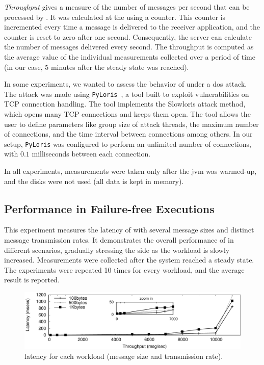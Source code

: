 \emph{Throughput} gives a measure of the number of messages per second that can be processed by \sieveq. 
It was calculated at the \postsieve using a counter. 
This counter is incremented every time a message is delivered to the receiver application, and the counter is reset to zero after one second. 
Consequently, the server can calculate the number of messages delivered every second. 
The throughput is computed as the average value of the individual measurements collected over a period of time (in our case, 5 minutes after the steady state was reached).

In some experiments, we wanted to assess the behavior of \sieveq under a \gls{dos} attack. 
The attack was made using \texttt{PyLoris}~\cite{pyloris}, a tool built to exploit vulnerabilities on TCP connection handling.
The tool implements the Slowloris attack method, which opens many TCP connections and keeps them open.
The tool allows the user to define parameters like group size of attack threads, the maximum number of connections, and the time interval between connections among others.
In our setup, \texttt{PyLoris} was configured to perform an unlimited number of connections, with $0.1$ milliseconds between each connection.

In all experiments, measurements were taken only after the \gls{jvm} was warmed-up, and the disks were not used (all data is kept in memory).


\subsection{Performance in Failure-free Executions}
\label{throughput_latency}

This experiment measures the latency of \sieveq with several message sizes and distinct message transmission rates. 
It demonstrates the overall performance of \sieveq in different scenarios, gradually stressing the \postsieve side as the workload is slowly increased. 
Measurements were collected after the system reached a steady state. 
The experiments were repeated 10 times for every workload, and the average result is reported.

\begin{figure}[t]
\centering
\includegraphics[width=\columnwidth]{images/gnuplot/sieveq/new_plot_latencyvsthroughput/latencyVSthroughput.pdf}
\caption{\sieveq latency for each workload (message size and transmission rate).}
\label{fig:lat_vs_throu}
\end{figure}

